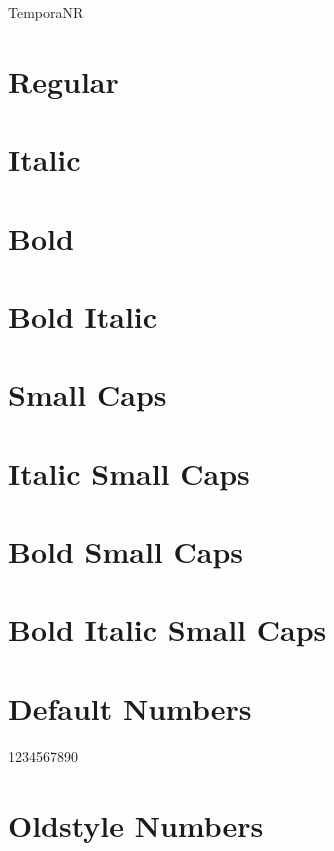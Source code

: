 \documentclass[a4paper]{article}
\begin{document}
\thispagestyle{empty}

\begin{center}\huge TemporaNR
\end{center}


\section*{Regular}
\lipsum[1]

\section*{Italic}
\emph{\lipsum[2]}

\section*{Bold}
\textbf{\lipsum[1]}

\section*{Bold Italic}
\textbf{\emph{\lipsum[2]}}

\section*{Small Caps}
\textsc{\lipsum[1]}

\section*{Italic Small Caps}
\emph{\textsc{\lipsum[2]}}

\section*{Bold Small Caps}
\textsc{\textbf{\lipsum[1]}}

\section*{Bold Italic Small Caps}
\emph{\textsc{\textbf{\lipsum[2]}}}

\section*{Default Numbers}

1234567890

\section*{Oldstyle Numbers}
\end{document}

